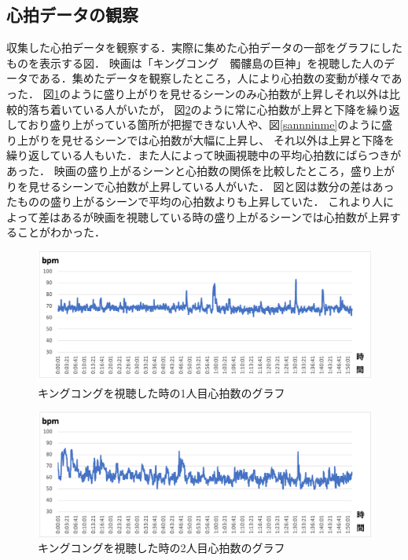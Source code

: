 \subsection{心拍データの観察}

収集した心拍データを観察する．実際に集めた心拍データの一部をグラフにしたものを表示する図．
映画は「キングコング　髑髏島の巨神」を視聴した人のデータである．集めたデータを観察したところ，人により心拍数の変動が様々であった．
図\ref{hitorime}のように盛り上がりを見せるシーンのみ心拍数が上昇しそれ以外は比較的落ち着いている人がいたが，
図\ref{futarime}のように常に心拍数が上昇と下降を繰り返しており盛り上がっている箇所が把握できない人や、図\ref{sannninme}のように盛り上がりを見せるシーンでは心拍数が大幅に上昇し、
それ以外は上昇と下降を繰り返している人もいた．また人によって映画視聴中の平均心拍数にばらつきがあった．
映画の盛り上がるシーンと心拍数の関係を比較したところ，盛り上がりを見せるシーンで心拍数が上昇している人がいた．
図と図は数分の差はあったものの盛り上がるシーンで平均の心拍数よりも上昇していた．
これより人によって差はあるが映画を視聴している時の盛り上がるシーンでは心拍数が上昇することがわかった．

\begin{figure}[H]
    \centering
    \includegraphics[width=16cm]{images/chapter3/gurafu2.png}
    \caption{キングコングを視聴した時の1人目心拍数のグラフ}
    \label{hitorime}
\end{figure}

\begin{figure}[H]
    \centering
    \includegraphics[width=16cm]{images/chapter3/gurafu.png}
    \caption{キングコングを視聴した時の2人目心拍数のグラフ}
    \label{futarime}
\end{figure}

